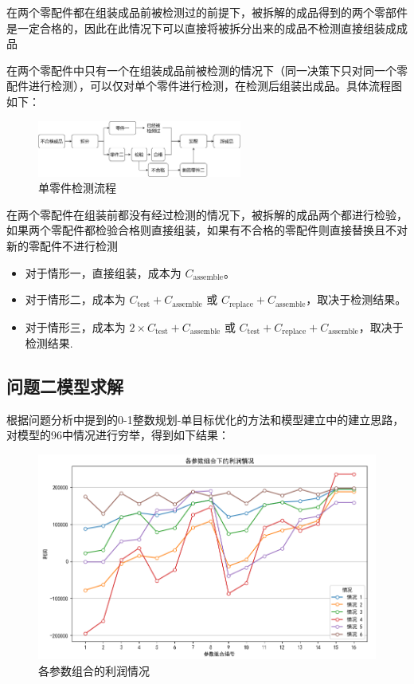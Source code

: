 \documentclass[withoutpreface,bwprint]{cumcmthesis}
\begin{document}
在两个零配件都在组装成品前被检测过的前提下，被拆解的成品得到的两个零部件是一定合格的，因此在此情况下可以直接将被拆分出来的成品不检测直接组装成成品

在两个零配件中只有一个在组装成品前被检测的情况下（同一决策下只对同一个零配件进行检测），可以仅对单个零件进行检测，在检测后组装出成品。具体流程图如下：

\begin{figure}[htbp]
    \centering
    \includegraphics[width=0.6\textwidth]{figure/单零件检测流程.png}
    \caption{单零件检测流程}
    \label{2-checkout}
\end{figure}

在两个零配件在组装前都没有经过检测的情况下，被拆解的成品两个都进行检验，如果两个零配件都检验合格则直接组装，如果有不合格的零配件则直接替换且不对新的零配件不进行检测





\begin{itemize}
   \item 对于情形一，直接组装，成本为 $ C_{\text{assemble}} $。
   \item 对于情形二，成本为 $ C_{\text{test}} + C_{\text{assemble}} $ 或 $ C_{\text{replace}} + C_{\text{assemble}} $，取决于检测结果。
   \item 对于情形三，成本为 $ 2 \times C_{\text{test}} + C_{\text{assemble}} $ 或 $ C_{\text{test}} + C_{\text{replace}} + C_{\text{assemble}}$，取决于检测结果.
\end{itemize}

   

\subsection{问题二模型求解}
根据问题分析中提到的0-1整数规划-单目标优化的方法和模型建立中的建立思路，对模型的96中情况进行穷举，得到如下结果：
\begin{figure}[htbp]
    \centering
    \includegraphics[width=1\textwidth]{figure/各参数组合的利润情况.png}
    \caption{各参数组合的利润情况}
    \label{2-profit}
\end{figure}
\end{document}
